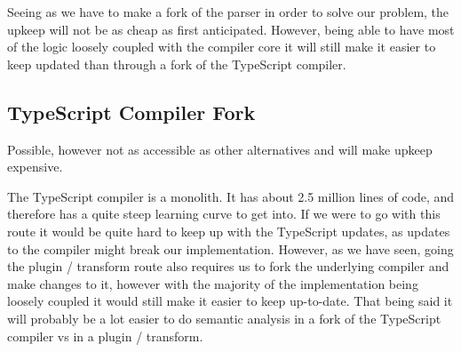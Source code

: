 Seeing as we have to make a fork of the parser in order to solve our problem, the upkeep will not be as cheap as first anticipated.
However, being able to have most of the logic loosely coupled with the compiler core it will still make it easier to keep updated than through a fork of the TypeScript compiler.


\subsection{TypeScript Compiler Fork}\label{subsec:typescript-compiler-fork}

Possible, however not as accessible as other alternatives and will make upkeep expensive.

The TypeScript compiler is a monolith.
It has about 2.5 million lines of code, and therefore has a quite steep learning curve to get into.
If we were to go with this route it would be quite hard to keep up with the TypeScript updates, as updates to the compiler might break our implementation.
However, as we have seen, going the plugin / transform route also requires us to fork the underlying compiler and make changes to it, however with the majority of the implementation being loosely coupled it would still make it easier to keep up-to-date.
That being said it will probably be a lot easier to do semantic analysis in a fork of the TypeScript compiler vs in a plugin / transform.
